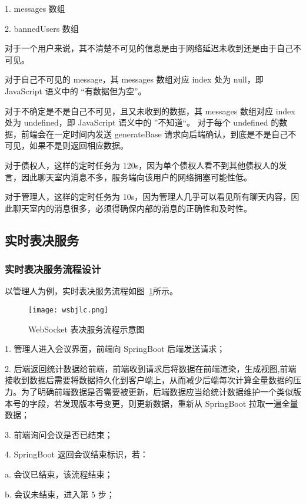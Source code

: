   \quad{}1. messages 数组

  \quad{}2. bannedUsers 数组

对于一个用户来说，其不清楚不可见的信息是由于网络延迟未收到还是由于自己不可见。

对于自己不可见的 message，其 messages 数组对应 index 处为 null，即 JavaScript 语义中的 “有数据但为空”。

对于不确定是不是自己不可见，且又未收到的数据，其 messages 数组对应 index 处为 undefined，即 JavaScript 语义中的 ”不知道“。
对于每个 undefined 的数据，前端会在一定时间内发送 generateBase 请求向后端确认，到底是不是自己不可见，如果不是则返回相应数据。

对于债权人，这样的定时任务为 120s，因为单个债权人看不到其他债权人的发言，因此聊天室内消息不多，服务端向该用户的网络拥塞可能性低。

对于管理人，这样的定时任务为 10s，因为管理人几乎可以看见所有聊天内容，因此聊天室内的消息很多，必须得确保内部的消息的正确性和及时性。

\subsection{实时表决服务}

\subsubsection{实时表决服务流程设计}
以管理人为例，实时表决服务流程如图~\ref{fig:wsbjlc}所示。

\begin{figure}[!htp]
    \centering
    \texttt{[image: wsbjlc.png]}
    \caption{WebSocket 表决服务流程示意图}
    \label{fig:wsbjlc}
  \end{figure}

  \quad{}1. 管理人进入会议界面，前端向 SpringBoot 后端发送请求；

  \quad{}2. 后端返回统计数据给前端，前端收到请求后将数据在前端渲染，生成视图,前端接收到数据后需要将数据持久化到客户端上，从而减少后端每次计算全量数据的压力。为了明确前端数据是否需要被更新，后端数据应当给统计数据维护一个类似版本号的字段，若发现版本号变更，则更新数据，重新从 SpringBoot 拉取一遍全量数据；

  \quad{}3. 前端询问会议是否已结束；

  \quad{}4. SpringBoot 返回会议结束标识，若：

  \quad{}\quad{}a. 会议已结束，该流程结束；
  
  \quad{}\quad{}b. 会议未结束，进入第 5 步；
  
